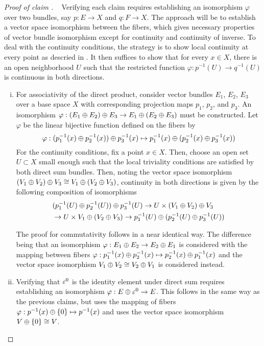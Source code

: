 \documentclass[../../sean_thesis.tex]{subfiles}
\begin{document}
\begin{proof}[Proof of claim ]~
	Verifying each claim requires establishing an isomorphism $\varphi$ over two bundles, say $p: E \to X$ and $q: F \to X$. The approach will be to establish a vector space isomorphism between the fibers, which gives necessary properties of vector bundle isomorphism except for continuity and continuity of inverse. To deal with the continuity conditions, the strategy is to show local continuity at every point as descried in . It then suffices to show that for every $x \in X$, there is an open neighborhood $U$ such that the restricted function $\varphi: p^{-1}(U) \to q^{-1}(U)$ is continuous in both directions.
	\begin{enumerate}[(i)]
		\item For associativity of the direct product, consider vector bundles $E_1$, $E_2$, $E_3$ over a base space $X$ with corresponding projection maps $p_1$, $p_2$, and $p_3$. An isomorphism $\varphi: (E_1 \oplus E_2) \oplus E_3 \to E_1 \oplus (E_2 \oplus E_3)$ must be constructed. Let $\varphi$ be the linear bijective function defined on the fibers by
		\begin{equation*}
			\varphi: (p^{-1}_1(x) \oplus p^{-1}_2(x)) \oplus p^{-1}_3(x) \mapsto p^{-1}_1(x) \oplus (p^{-1}_2(x) \oplus p^{-1}_3(x))
		\end{equation*}
		For the continuity conditions, fix a point $x \in X$. Then, choose an open set $U \subset X$ small enough such that the local triviality conditions are satisfied by both direct sum bundles. Then, noting the vector space isomorphism $(V_1 \oplus V_2) \oplus V_3 \cong V_1 \oplus (V_2 \oplus V_3)$, continuity in both directions is given by the following composition of isomorphisms
		\begin{align*}
			&(p^{-1}_1(U) \oplus p^{-1}_2(U)) \oplus p^{-1}_3(U)
			\to U \times (V_1 \oplus V_2) \oplus V_3\\
			&\to U \times V_1 \oplus (V_2 \oplus V_3)
			\to p^{-1}_1(U) \oplus (p^{-1}_2(U) \oplus p^{-1}_3(U))
		\end{align*}		
		
		The proof for commutativity follows in a near identical way. The difference being that an isomorphism $\varphi: E_1 \oplus E_2 \to E_2 \oplus E_1$ is considered with the mapping between fibers $\varphi: p^{-1}_1(x) \oplus p^{-1}_2(x) \mapsto p^{-1}_2(x) \oplus p^{-1}_1(x)$ and the vector space isomorphism $V_1 \oplus V_2 \cong V_2 \oplus V_1$ is considered instead.
		
		\item Verifying that $\varepsilon^{0}$ is the identity element under direct sum requires establishing an isomorphism $\varphi: E \oplus \varepsilon^{0} \to E$. This follows in the same way as the previous claims, but uses the mapping of fibers $\varphi: p^{-1}(x) \oplus \left\{0\right\} \mapsto p^{-1}(x)$ and uses the vector space isomorphism $V \oplus \left\{0\right\} \cong V$.
		

\end{enumerate}
\end{proof}
\end{document}
